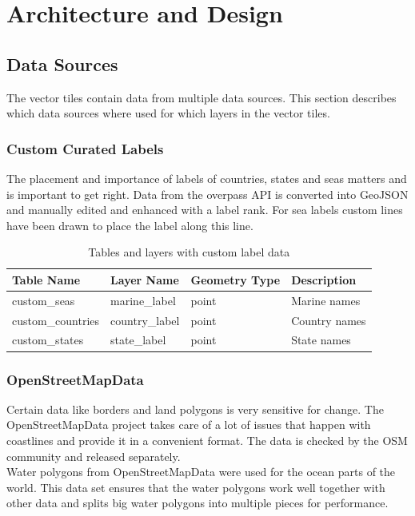 \chapter{Architecture and Design}\label{design}

\section{Data Sources}\label{data_sources}

The vector tiles contain data from multiple data sources. This section describes which data sources where used for which layers in the vector tiles.

\subsection{Custom Curated Labels}

The placement and importance of labels of countries, states and seas matters\cite{12_axismaps.github.io_2015} and is important to get right. Data from the overpass API \cite{13_wiki.openstreetmap.org_2015} is converted into GeoJSON and
manually edited and enhanced with a label rank. For sea labels custom lines have been drawn to place the label along this line.

\begin{table}[H]
\centering
    \begin{tabular}{llll}
    \hline
    Table Name   & Layer Name & Geometry Type & Description \\
    \hline                                          
    custom\_seas       & marine\_label & point    & Marine names \\
    custom\_countries    & country\_label & point    & Country names \\
    custom\_states       & state\_label & point    & State names \\
    \end{tabular}
    \caption{Tables and layers with custom label data}
\end{table}

\subsection{OpenStreetMapData}

Certain \osm{} data like borders and land polygons is very sensitive for change.
The OpenStreetMapData\cite{14_openstreetmapdata.com_2015}
project takes care of a lot of issues that happen with coastlines
and provide it in a convenient format. The data is checked by the OSM community
and released separately.
\\
Water polygons\cite{15_openstreetmapdata.com_2015} from OpenStreetMapData were used for the ocean parts of the world. This data set ensures that the water polygons
work well together with other \osm{} data and splits big water polygons into multiple 
pieces for performance.

